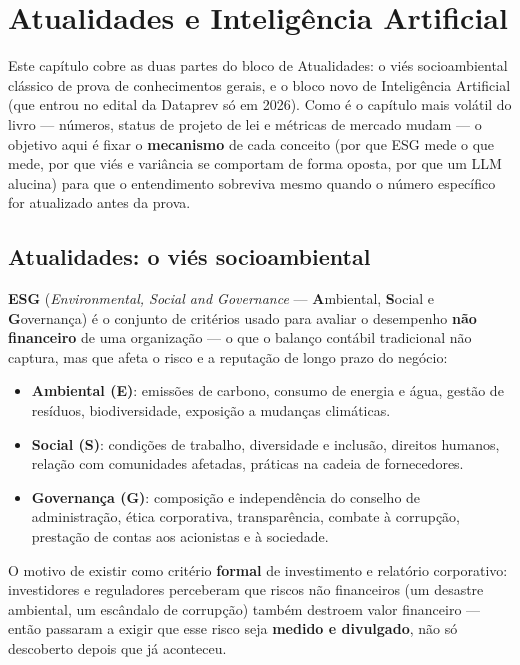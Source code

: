 \chapter{Atualidades e Inteligência Artificial}
\label{cap:atualidades-teoria}

Este capítulo cobre as duas partes do bloco de Atualidades: o viés
socioambiental clássico de prova de conhecimentos gerais, e o bloco novo de
Inteligência Artificial (que entrou no edital da Dataprev só em 2026). Como
é o capítulo mais volátil do livro --- números, status de projeto de lei e
métricas de mercado mudam --- o objetivo aqui é fixar o \textbf{mecanismo}
de cada conceito (por que ESG mede o que mede, por que viés e variância se
comportam de forma oposta, por que um LLM alucina) para que o entendimento
sobreviva mesmo quando o número específico for atualizado antes da prova.

\section{Atualidades: o viés socioambiental}

\begin{conceito}
\textbf{ESG} (\textit{Environmental, Social and Governance} ---
\textbf{A}mbiental, \textbf{S}ocial e \textbf{G}overnança) é o conjunto de
critérios usado para avaliar o desempenho \textbf{não financeiro} de uma
organização --- o que o balanço contábil tradicional não captura, mas que
afeta o risco e a reputação de longo prazo do negócio:

\begin{itemize}
\item \textbf{Ambiental (E)}: emissões de carbono, consumo de energia e
água, gestão de resíduos, biodiversidade, exposição a mudanças climáticas.
\item \textbf{Social (S)}: condições de trabalho, diversidade e inclusão,
direitos humanos, relação com comunidades afetadas, práticas na cadeia de
fornecedores.
\item \textbf{Governança (G)}: composição e independência do conselho de
administração, ética corporativa, transparência, combate à corrupção,
prestação de contas aos acionistas e à sociedade.
\end{itemize}

O motivo de existir como critério \textbf{formal} de investimento e
relatório corporativo: investidores e reguladores perceberam que riscos
não financeiros (um desastre ambiental, um escândalo de corrupção) também
destroem valor financeiro --- então passaram a exigir que esse risco seja
\textbf{medido e divulgado}, não só descoberto depois que já aconteceu.
\end{conceito}

